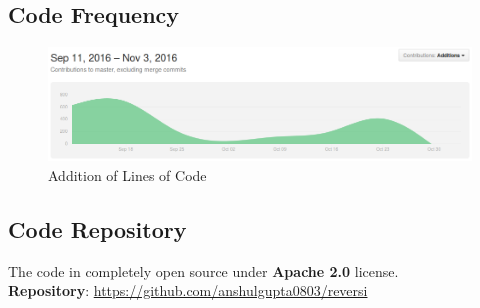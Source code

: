 \documentclass[a4paper,10pt]{article}
\begin{document}
\subsection*{Code Frequency}
\begin{figure}[h]
  \centering
  \includegraphics[scale=0.45]{Frequency.png}
  \caption{Addition of Lines of Code}
\end{figure}

\subsection*{Code Repository}
The code in completely open source under \textbf{Apache 2.0} license.\\
\textbf{Repository}: \href{https://github.com/anshulgupta0803/reversi}{https://github.com/anshulgupta0803/reversi}
\newpage
\end{document}
